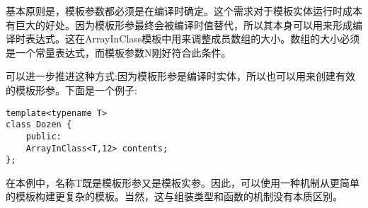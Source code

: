 基本原则是，模板参数都必须是在编译时确定。这个需求对于模板实体运行时成本有巨大的好处。因为模板形参最终会被编译时值替代，所以其本身可以用来形成编译时表达式。这在ArrayInClass模板中用来调整成员数组的大小。数组的大小必须是一个常量表达式，而模板参数N刚好符合此条件。

可以进一步推进这种方式:因为模板形参是编译时实体，所以也可以用来创建有效的模板形参。下面是一个例子:

\begin{lstlisting}[style=styleCXX]
template<typename T>
class Dozen {
	public:
	ArrayInClass<T,12> contents;
};
\end{lstlisting}

在本例中，名称T既是模板形参又是模板实参。因此，可以使用一种机制从更简单的模板构建更复杂的模板。当然，这与组装类型和函数的机制没有本质区别。


























